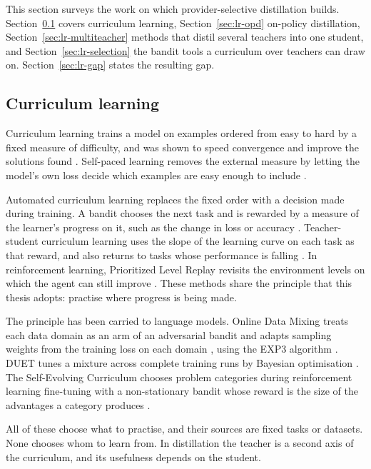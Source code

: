 This section surveys the work on which provider-selective distillation builds.
Section~\ref{sec:lr-curriculum} covers curriculum learning, Section~\ref{sec:lr-opd}
on-policy distillation, Section~\ref{sec:lr-multiteacher} methods that distil several
teachers into one student, and Section~\ref{sec:lr-selection} the bandit tools a
curriculum over teachers can draw on. Section~\ref{sec:lr-gap} states the resulting
gap.

\subsection{Curriculum learning}
\label{sec:lr-curriculum}

Curriculum learning trains a model on examples ordered from easy to hard by a fixed
measure of difficulty, and was shown to speed convergence and improve the solutions
found \autocite{bengio_curriculum_2009}. Self-paced learning removes the external
measure by letting the model's own loss decide which examples are easy enough to
include \autocite{kumar_selfpaced_2010}.

Automated curriculum learning replaces the fixed order with a decision made during
training. A bandit chooses the next task and is rewarded by a measure of the learner's
progress on it, such as the change in loss or accuracy
\autocite{graves_curriculum_2017}. Teacher-student curriculum learning uses the slope of
the learning curve on each task as that reward, and also returns to tasks whose
performance is falling \autocite{matiisen_tscl_2017}. In reinforcement learning,
Prioritized Level Replay revisits the environment levels on which the agent can still
improve \autocite{jiang_plr_2021}. These methods share the principle that this thesis
adopts: practise where progress is being made.

The principle has been carried to language models. Online Data Mixing treats each data
domain as an arm of an adversarial bandit and adapts sampling weights from the training
loss on each domain \autocite{albalak_odm_2023}, using the EXP3 algorithm
\autocite{auer_exp3_2002}. DUET tunes a mixture across complete training runs by
Bayesian optimisation \autocite{chen_duet_2026}. The Self-Evolving Curriculum chooses
problem categories during reinforcement learning fine-tuning with a non-stationary
bandit whose reward is the size of the advantages a category produces
\autocite{chen_sec_2025}.

All of these choose what to practise, and their sources are fixed tasks or datasets.
None chooses whom to learn from. In distillation the teacher is a second axis of the
curriculum, and its usefulness depends on the student.

